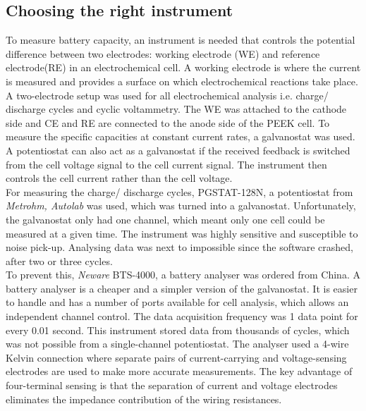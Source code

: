 \subsection*{Choosing the right instrument}
To measure battery capacity, an instrument is needed that controls the potential difference between two electrodes: working electrode (WE) and reference electrode(RE) in an electrochemical cell. A working electrode is where the current is measured and provides a surface on which electrochemical reactions take place. A two-electrode setup was used for all electrochemical analysis i.e. charge/ discharge cycles and cyclic voltammetry. The WE was attached to the cathode side and CE and RE are connected to the anode side of the PEEK cell. To measure the specific capacities at constant current rates, a galvanostat was used. A potentiostat can also act as a galvanostat if the received feedback is switched from the cell voltage signal to the cell current signal. The instrument then controls the cell current rather than the cell voltage. \\
For measuring the charge/ discharge cycles, PGSTAT-128N, a potentiostat from \textit{Metrohm, Autolab} was used, which was turned into a galvanostat. Unfortunately, the galvanostat only had one channel, which meant only one cell could be measured at a given time. The instrument was highly sensitive and susceptible to noise pick-up. Analysing data was next to impossible since the software crashed, after two or three cycles. \\
To prevent this, \textit{Neware} BTS-4000, a battery analyser was ordered from China. A battery analyser is a cheaper and a simpler version of the galvanostat. It is easier to handle and has a number of ports available for cell analysis, which allows an independent channel control. The data acquisition frequency was 1 data point for every 0.01 second. This instrument stored data from thousands of cycles, which was not possible from a single-channel potentiostat. The analyser used a 4-wire Kelvin connection where separate pairs of current-carrying and voltage-sensing electrodes are used to make more accurate measurements. The key advantage of four-terminal sensing is that the separation of current and voltage electrodes eliminates the impedance contribution of the wiring resistances. 
